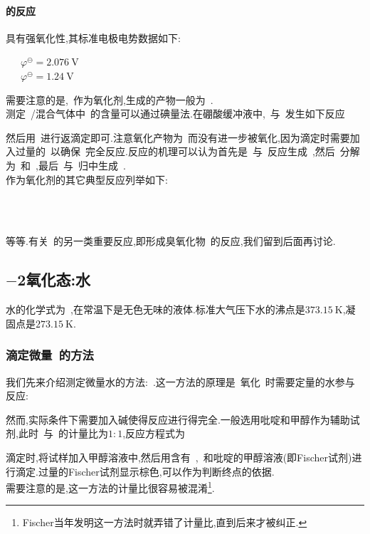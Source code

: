 \documentclass{ctexbook}
\begin{document}
\paragraph{的反应}
具有强氧化性,其标准电极电势数据如下:
\begin{tightcenter}
    \ \ \ $\varphi^\ominus=\SI{+2.076}{\volt}$\\
    \ \ \ $\varphi^\ominus=\SI{+1.24}{\volt}$
\end{tightcenter}
需要注意的是,~作为氧化剂,生成的产物一般为~.\\
\indent 测定~/混合气体中~的含量可以通过碘量法.在硼酸缓冲液中,~与~发生如下反应
\begin{tightcenter}
\end{tightcenter}
然后用~进行返滴定即可.注意氧化产物为~而没有进一步被氧化,因为滴定时需要加入过量的~以确保~完全反应.反应的机理可以认为首先是~与~反应生成~,然后~分解为~和~,最后~与~归中生成~\cite{Sakamoto2009}.\\
\indent {}作为氧化剂的其它典型反应列举如下:
\begin{tightcenter}
    \\
    \\
\end{tightcenter}
等等.有关~的另一类重要反应,即形成臭氧化物~的反应,我们留到后面再讨论.
\subsection{$-$2氧化态:水~}
水的化学式为~,在常温下是无色无味的液体.标准大气压下水的沸点是$\SI{373.15}{\kelvin}$,凝固点是$\SI{273.15}{\kelvin}$.
\subsubsection{滴定微量~的方法}
我们先来介绍测定微量水的方法:~.这一方法的原理是~氧化~时需要定量的水参与反应:
\begin{tightcenter}
\end{tightcenter}
然而,实际条件下需要加入碱使得反应进行得完全.一般选用吡啶和甲醇作为辅助试剂,此时~与~的计量比为$1:1$,反应方程式为
\begin{tightcenter}
\end{tightcenter}
滴定时,将试样加入甲醇溶液中,然后用含有~,~和吡啶的甲醇溶液(即Fischer试剂)进行滴定.过量的Fischer试剂显示棕色,可以作为判断终点的依据.\\
\indent 需要注意的是,这一方法的计量比很容易被混淆\footnote{Fischer当年发明这一方法时就弄错了计量比,直到后来才被纠正.}.
\end{document}
